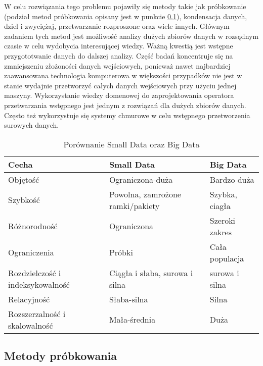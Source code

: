 \documentclass{article}
\begin{document}
W celu rozwiązania tego problemu pojawiły się metody takie jak próbkowanie (podział metod próbkowania opisany jest w punkcie \ref{sampling_methods}), kondensacja danych, dziel i zwyciężaj, przetwarzanie rozproszone oraz wiele innych. Głównym zadaniem tych metod jest możliwość analizy dużych zbiorów danych w rozsądnym czasie w celu wydobycia interesującej wiedzy. Ważną kwestią jest wstępne przygototwanie danych do dalszej analizy. Część badań  koncentruje się na zmniejszeniu złożoności danych wejściowych, ponieważ nawet najbardziej zaawansowana technologia komputerowa w większości przypadków nie jest w stanie wydajnie przetworzyć całych danych wejściowych przy użyciu jednej maszyny. Wykorzystanie wiedzy domenowej do zaprojektowania operatora przetwarzania wstępnego jest jednym z rozwiązań dla dużych zbiorów danych. Często też wykorzystuje się systemy chmurowe w celu wstępnego przetworzenia surowych danych.


\begin{table}[h!]
    \centering
  \begin{tabular}{ |p{4cm}||p{4cm}|p{4cm}|  }
 \hline
Cecha& Small Data& Big Data\\
 \hline
 \hline
Objętość & Ograniczona-duża & Bardzo duża\\
\hline
Szybkość & Powolna, zamrożone ramki/pakiety & Szybka, ciagła\\
\hline
Różnorodność & Ograniczona & Szeroki zakres\\
\hline
Ograniczenia & Próbki & Cała populacja\\
\hline
Rozdzielczość i indeksykowalność & Ciągła i słaba, surowa i silna & surowa i silna\\
\hline
Relacyjność & Słaba-silna & Silna\\
\hline
Rozszerzalność i skalowalność & Mała-średnia & Duża\\
 \hline
\end{tabular}
    \caption{Porównanie Small Data oraz Big Data}
    \label{tab:my_label}
\end{table}



\subsection{Metody próbkowania}
\label{sampling_methods}
\end{document}
